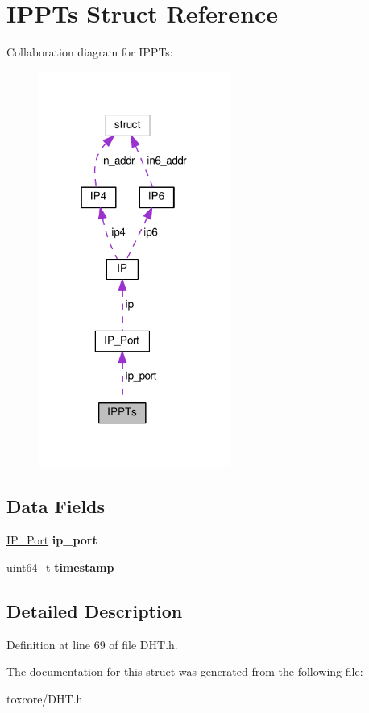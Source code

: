 \hypertarget{struct_i_p_p_ts}{\section{I\+P\+P\+Ts Struct Reference}
\label{struct_i_p_p_ts}
}


Collaboration diagram for I\+P\+P\+Ts\+:\nopagebreak
\begin{figure}[H]
\begin{center}
\leavevmode
\includegraphics[width=178pt]{struct_i_p_p_ts__coll__graph}
\end{center}
\end{figure}
\subsection*{Data Fields}
\begin{DoxyCompactItemize}
\item 
\hypertarget{struct_i_p_p_ts_a86e2a5a56c0dd22df6e8b8a10e40f9e4}{\hyperlink{struct_i_p___port}{I\+P\+\_\+\+Port} {\bfseries ip\+\_\+port}}\label{struct_i_p_p_ts_a86e2a5a56c0dd22df6e8b8a10e40f9e4}

\item 
\hypertarget{struct_i_p_p_ts_a465bef81f6478756e5443025b1f2ddfa}{uint64\+\_\+t {\bfseries timestamp}}\label{struct_i_p_p_ts_a465bef81f6478756e5443025b1f2ddfa}

\end{DoxyCompactItemize}


\subsection{Detailed Description}


Definition at line 69 of file D\+H\+T.\+h.



The documentation for this struct was generated from the following file\+:\begin{DoxyCompactItemize}
\item 
toxcore/D\+H\+T.\+h\end{DoxyCompactItemize}
